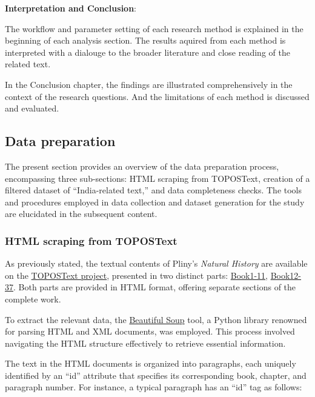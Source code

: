 \documentclass[
  12pt,
]{article}
\begin{document}
\textbf{Interpretation and Conclusion}:

The workflow and parameter setting of each research method is explained
in the beginning of each analysis section. The results aquired from each
method is interpreted with a dialouge to the broader literature and
close reading of the related text.

In the Conclusion chapter, the findings are illustrated comprehensively
in the context of the research questions. And the limitations of each
method is discussed and evaluated.

\hypertarget{data-preparation}{%
\subsection{Data preparation}\label{data-preparation}}

The present section provides an overview of the data preparation
process, encompassing three sub-sections: HTML scraping from TOPOSText,
creation of a filtered dataset of ``India-related text,'' and data
completeness checks. The tools and procedures employed in data
collection and dataset generation for the study are elucidated in the
subsequent content.

\hypertarget{html-scraping-from-topostext}{%
\subsubsection{HTML scraping from
TOPOSText}\label{html-scraping-from-topostext}}

As previously stated, the textual contents of Pliny's \emph{Natural
History} are available on the
\href{https://topostext.org/the-project}{TOPOSText project}, presented
in two distinct parts: \href{https://topostext.org/work/148}{Book1-11},
\href{https://topostext.org/work/153}{Book12-37}. Both parts are
provided in HTML format, offering separate sections of the complete
work.

To extract the relevant data, the
\href{https://www.crummy.com/software/BeautifulSoup/bs4/doc/}{Beautiful
Soup} tool, a Python library renowned for parsing HTML and XML
documents, was employed. This process involved navigating the HTML
structure effectively to retrieve essential information.

The text in the HTML documents is organized into paragraphs, each
uniquely identified by an ``id'' attribute that specifies its
corresponding book, chapter, and paragraph number. For instance, a
typical paragraph has an ``id'' tag as follows:
\end{document}
